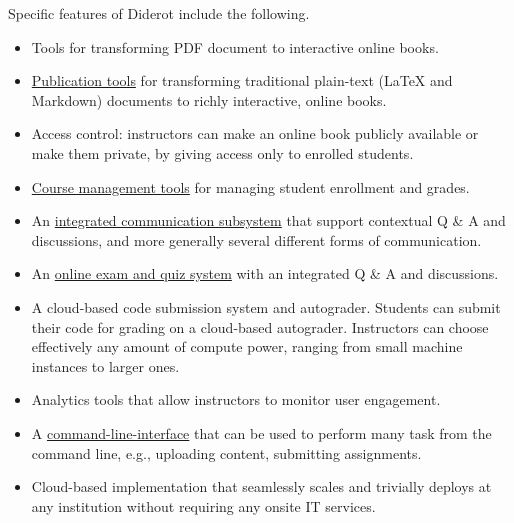 \begin{gram}[Features]
%
Specific features of Diderot include the following.

\begin{itemize}

\item
Tools for transforming PDF document to interactive online books.

\item  
\href{ch:dc}{Publication tools} 
%
for transforming traditional plain-text (LaTeX and Markdown) documents
to richly interactive, online books.

%


\item 
Access control: instructors can make an online book publicly
available or make them private, by giving access only to enrolled
students.

 
\item \href{ch:lms}{Course management tools} for managing student enrollment and grades.

\item An \href{ch:posts}{integrated communication subsystem} that support contextual Q
  \& A and discussions, and more generally several different forms of
  communication.
  
\item An \href{ch:quiz}{online exam and quiz system} with an integrated Q \& A and discussions.  

\item A cloud-based code submission system and autograder. Students
  can submit their code for grading on a cloud-based
  autograder. Instructors can choose effectively any amount of compute
  power, ranging from small machine instances to larger ones.

\item
  Analytics tools that allow instructors to monitor user
  engagement.

\item A \href{ch:cli}{command-line-interface} that can be used to
  perform many task from the command line, e.g., uploading content,
  submitting assignments.

\item  
  Cloud-based implementation that seamlessly scales and trivially
  deploys at any institution without requiring any onsite IT services.
\end{itemize}
\end{gram}
